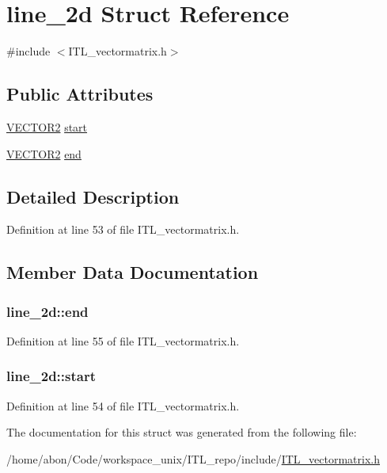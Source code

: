 \hypertarget{structline__2d}{
\section{line\_\-2d Struct Reference}
\label{structline__2d}
}


{\ttfamily \#include $<$ITL\_\-vectormatrix.h$>$}

\subsection*{Public Attributes}
\begin{DoxyCompactItemize}
\item 
\hyperlink{classVECTOR2}{VECTOR2} \hyperlink{structline__2d_a9bdc6824a8ea1f195b4286d4155dfa5d}{start}
\item 
\hyperlink{classVECTOR2}{VECTOR2} \hyperlink{structline__2d_a6147946f41a7b50692c7bfe9a1f51360}{end}
\end{DoxyCompactItemize}


\subsection{Detailed Description}


Definition at line 53 of file ITL\_\-vectormatrix.h.



\subsection{Member Data Documentation}
\hypertarget{structline__2d_a6147946f41a7b50692c7bfe9a1f51360}{
\subsubsection[{end}]{ {\bf line\_\-2d::end}}}
\label{structline__2d_a6147946f41a7b50692c7bfe9a1f51360}


Definition at line 55 of file ITL\_\-vectormatrix.h.

\hypertarget{structline__2d_a9bdc6824a8ea1f195b4286d4155dfa5d}{
\subsubsection[{start}]{ {\bf line\_\-2d::start}}}
\label{structline__2d_a9bdc6824a8ea1f195b4286d4155dfa5d}


Definition at line 54 of file ITL\_\-vectormatrix.h.



The documentation for this struct was generated from the following file:\begin{DoxyCompactItemize}
\item 
/home/abon/Code/workspace\_\-unix/ITL\_\-repo/include/\hyperlink{ITL__vectormatrix_8h}{ITL\_\-vectormatrix.h}\end{DoxyCompactItemize}
